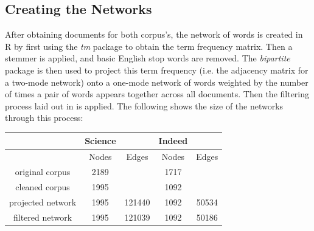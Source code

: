 \documentclass[12pt]{article}
\begin{document}
\subsection{Creating the Networks}

After obtaining documents for both corpus's, the network of words is created in R by first using the \textit{tm} package to obtain the term frequency matrix. Then a stemmer is applied, and basic English stop words are removed. The \textit{bipartite} package is then used to project this term frequency (i.e. the adjacency matrix for a two-mode network) onto a one-mode network of words weighted by the number of times a pair of words appears together across all documents. Then the filtering process laid out in \cite{mainExtra} is applied. The following shows the size of the networks through this process:
\vspace{2mm}
\begin{center}
	\begin{tabular}{ |c|c|c||c|c|  }
		\hline
		&Science& &Indeed &\\
		\hline
		&Nodes&Edges&Nodes&Edges \\
		\hline
		original corpus& 2189& &1717 & \\
		cleaned corpus& 1995& & 1092&\\
		projected network& 1995& 121440& 1092&50534\\
		filtered network& 1995&121039 & 1092&50186\\
		\hline
	\end{tabular}
\end{center}
 
\end{document}
